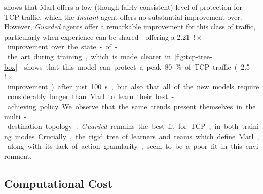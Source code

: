 \documentclass[10pt, times, comsoc]{IEEEtran}
\begin{document}
%	

 shows that Marl offers a low (though fairly consistent) level of protection for TCP traffic, which the \emph{Instant} agent offers no substantial improvement over.
However, \emph{Guarded} agents offer a remarkable improvement for this class of traffic, particularly when experience can be shared---offering a \SI{2.21}{$!\times$} improvement over the state-of-the art during training, which is made clearer in \cref{fig:tcp-tree-box}.
 shows that this model can protect a peak \SI{80}{\percent} of TCP traffic (\SI{2.5}{$!\times$} improvement) after just \SI{100}{\second}, but also that all of the new models require considerably longer than Marl to learn their best-achieving policy.

We observe that the same trends present themselves in the multi-destination topology: \emph{Guarded} remains the best fit for TCP, in both training modes.
Crucially, the rigid tree of learners and teams which define Marl, along with its lack of action granularity, seem to be a poor fit in this environment.


\subsection{Computational Cost}
\end{document}
